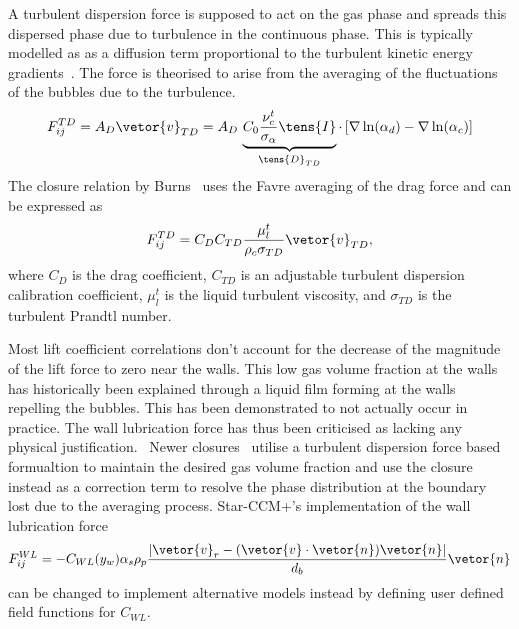 A turbulent dispersion force is supposed to act on the gas phase and 
 spreads this dispersed phase due to turbulence
 in the continuous phase. This is typically modelled as 
 as a diffusion term proportional to the turbulent 
 kinetic energy gradients~\cite{liaoFlashingEvaporationDifferent2013}. 
 The force is theorised to arise from the averaging of the fluctuations
 of the bubbles due to the turbulence.
 \begin{equation}
    F_{ij}^{TD} = A_{D} \vetor{v}_{TD}
    = A_{D}\,\underbrace{C_{0} \frac{\nu_{c}^{t}}{\sigma_{\alpha}}\tens{I}}_{\tens{D}_{TD}} \cdot 
    \left[
        \nabla \ln(\alpha_{d}) - \nabla \ln(\alpha_{c})
        \right]
 \end{equation}
 The closure relation by Burns~ uses the Favre averaging of the drag
 force and can be expressed as
 \begin{equation}
    F_{ij}^{TD} = C_{D} C_{TD} \frac{\mu_{l}^{t}}{\rho_{c} \sigma_{TD}}\vetor{v}_{TD},
 \end{equation}
 where $C_{D}$ is the drag coefficient, $C_{TD}$ is an adjustable turbulent dispersion
 calibration coefficient, $\mu_{l}^{t}$ is the liquid turbulent viscosity, and
 $\sigma_{TD}$ is the turbulent Prandtl number.

Most lift
 coefficient correlations don't account for the decrease of the magnitude of the
 lift force to zero 
 near the walls. This low gas volume fraction at the walls has historically
 been explained
 through a liquid film forming at the walls repelling the bubbles. This has been demonstrated to
 not actually occur in practice. The wall lubrication force has thus been criticised
 as lacking any physical justification.~\cite{sugrueRobustMomentumClosure,colomboBenchmarkingCFDModelling}
 Newer closures~ utilise a turbulent dispersion force based 
 formualtion to maintain the desired gas volume fraction and use the closure instead
 as a correction term to resolve the phase distribution at the boundary lost due to
 the averaging process. Star-CCM+'s implementation of the wall lubrication force
 \begin{equation}
    F_{ij}^{WL} = - C_{WL}(y_{w})\alpha_{s} \rho_{p} 
    \frac{|\vetor{v}_{r} - (\vetor{v}\cdot \vetor{n})\vetor{n}|}{d_{b}} \vetor{n}
 \end{equation}
 can be changed to implement alternative models instead by defining user defined 
 field functions for $C_{WL}$.

